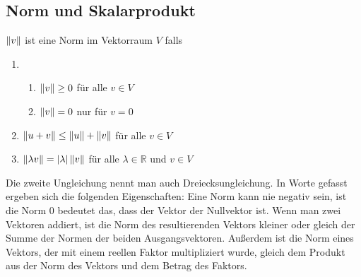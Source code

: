 


%


\subsection{Norm und Skalarprodukt}

\begin{Def}
$\left\lVert v\right\rVert$ ist eine Norm im Vektorraum $V$ falls
\begin{enumerate}
\item 
\begin{enumerate}
\item $\left\lVert v\right\rVert \geq 0$ für alle $v \in V$
\item $\left\lVert v\right\rVert = 0$ nur für $v = 0$
\end{enumerate}
\item $\left\lVert u+v\right\rVert \leq \left\lVert u\right\rVert + \left\lVert v\right\rVert$ für alle $v \in V$
\item $\left\lVert\lambda v\right\rVert = |\lambda| \left\lVert v\right\rVert$ für alle $\lambda \in \mathbb{R}$ und $v \in V$
\end{enumerate}
\end{Def}

Die zweite Ungleichung nennt man auch Dreiecksungleichung.
In Worte gefasst ergeben sich die folgenden Eigenschaften: Eine Norm kann nie negativ sein, ist die Norm 0 bedeutet das, dass der Vektor der Nullvektor ist. Wenn man zwei Vektoren
addiert, ist die Norm des resultierenden Vektors kleiner oder gleich der Summe der Normen der beiden Ausgangsvektoren. Außerdem ist die
Norm eines Vektors, der mit einem reellen Faktor multipliziert wurde, gleich dem Produkt aus der Norm des Vektors und dem 
Betrag des Faktors.

